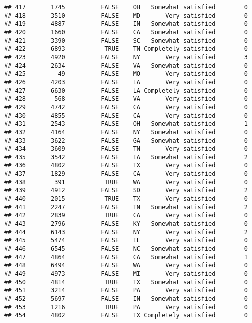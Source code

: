 \documentclass[]{book}
\theoremstyle{definition}
\theoremstyle{definition}
\theoremstyle{remark}
\begin{document}
\begin{verbatim}
## 417       1745          FALSE    OH   Somewhat satisfied        0
## 418       3510          FALSE    MD       Very satisfied        0
## 419       4887          FALSE    IN   Somewhat satisfied        0
## 420       1660          FALSE    CA   Somewhat satisfied        0
## 421       3390          FALSE    SC   Somewhat satisfied        0
## 422       6893           TRUE    TN Completely satisfied        0
## 423       4920          FALSE    NY       Very satisfied        3
## 424       2634          FALSE    VA   Somewhat satisfied        0
## 425         49          FALSE    MO       Very satisfied        0
## 426       4203          FALSE    LA       Very satisfied        0
## 427       6630          FALSE    LA Completely satisfied        0
## 428        568          FALSE    VA       Very satisfied        0
## 429       4742          FALSE    CA       Very satisfied        0
## 430       4855          FALSE    CA       Very satisfied        0
## 431       2543          FALSE    OH   Somewhat satisfied        1
## 432       4164          FALSE    NY   Somewhat satisfied        0
## 433       3622          FALSE    GA   Somewhat satisfied        0
## 434       3609          FALSE    TN       Very satisfied        0
## 435       3542          FALSE    IA   Somewhat satisfied        2
## 436       4802          FALSE    TX       Very satisfied        0
## 437       1829          FALSE    CA       Very satisfied        0
## 438        391           TRUE    WA       Very satisfied        0
## 439       4912          FALSE    SD       Very satisfied        2
## 440       2015           TRUE    TX       Very satisfied        0
## 441       2247          FALSE    TN   Somewhat satisfied        2
## 442       2839           TRUE    CA       Very satisfied        0
## 443       2796          FALSE    KY   Somewhat satisfied        0
## 444       6143          FALSE    NY       Very satisfied        2
## 445       5474          FALSE    IL       Very satisfied        0
## 446       6545          FALSE    NC   Somewhat satisfied        0
## 447       4864          FALSE    CA   Somewhat satisfied        1
## 448       6494          FALSE    WA       Very satisfied        0
## 449       4973          FALSE    MI       Very satisfied        0
## 450       4814           TRUE    TX   Somewhat satisfied        0
## 451       3214          FALSE    PA       Very satisfied        0
## 452       5697          FALSE    IN   Somewhat satisfied        0
## 453       1216           TRUE    PA       Very satisfied        0
## 454       4802          FALSE    TX Completely satisfied        0

\end{verbatim}
\end{document}
